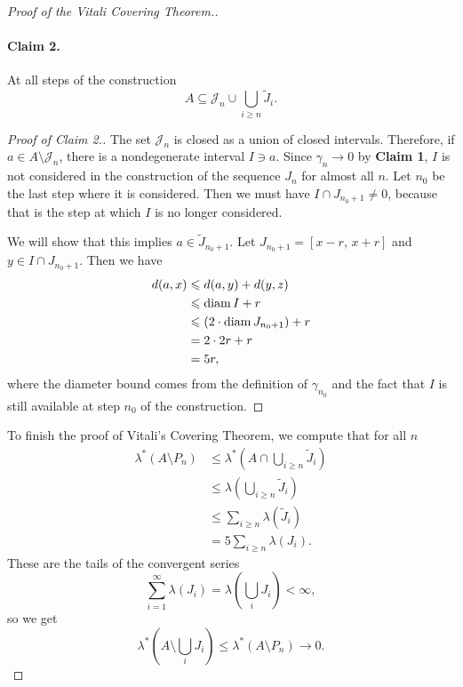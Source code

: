 \begin{proof}[Proof of the Vitali Covering Theorem.]
   \paragraph{Claim 2.} At all steps of the construction
   \[ 
       A \subseteq \mathcal{J}_n \cup \bigcup_{i \geqslant n} \widetilde{J}_i.
  \]
  \begin{proof}[Proof of Claim 2.]
      The set \( \mathcal{J}_n \) is closed as a union of closed intervals. Therefore, if \( a \in A  \setminus \mathcal{J}_n \), there is a nondegenerate interval \( I \ni a \). Since \( \gamma_n \to 0 \) by \textbf{Claim 1}, \( I \) is not considered in the construction of the sequence \( J_n \) for almost all \( n \). Let \( n_0 \) be the last step where it is considered. Then we must have \( I \cap J_{n_0 + 1} \neq 0\), because that is the step at which \( I \) is no longer considered.

      We will show that this implies \( a \in \widetilde{J}_{n_0 + 1} \). Let \( J_{n_0 + 1} = [x - r,\, x + r] \) and \( y \in I \cap J_{n_0 + 1} \). Then we have
      \begin{align*}
          d(a, x) &\leqslant d(a,y) + d(y,z) \\
                  &\leqslant \operatorname{diam} I + r \\
                  &\leqslant \left(  2\cdot \operatorname{diam} J_{n_0 + 1} \right)+ r \\
                  &= 2 \cdot 2r + r \\
                  &= 5r,
      \end{align*}
      where the diameter bound comes from the definition of \( \gamma_{n_0} \) and the fact that \( I \) is still available at step \( n_0 \) of the construction.
  \end{proof}
  
  To finish the proof of Vitali's Covering Theorem, we compute that for all \( n \)
  \begin{align*}
      \lambda^* \left( A \setminus P_n \right) &\leqslant\lambda^* \left( A \cap \bigcup_{i \geqslant n} \widetilde{J}_i \right) \\
                                               &\leqslant \lambda \left( \bigcup_{i \geqslant n} \widetilde{J}_i \right) \\
                                               &\leqslant \sum_{i \geqslant n}\lambda(\widetilde{J}_i) \\
                                               &= 5\sum_{i \geqslant n}\lambda(J_i).
  \end{align*}
  These are the tails of the convergent series
  \[ 
      \sum_{i=1}^{\infty}\lambda(J_i) =\lambda \left( \bigcup_i J_i \right) < \infty,
 \]
 so we get
 \[ 
  \lambda^* \left( A \setminus \bigcup_i J_i \right) \leqslant \lambda^* \left( A \setminus P_n \right) \to 0.
\]
\end{proof}

